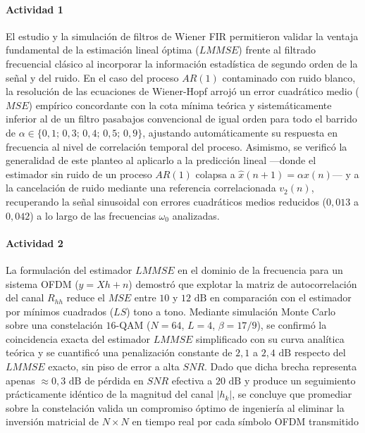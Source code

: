 \documentclass[a4paper]{article}
\begin{document}
\paragraph{Actividad 1}
El estudio y la simulación de filtros de Wiener FIR permitieron validar la ventaja fundamental de la estimación lineal óptima ($LMMSE$) frente al filtrado frecuencial clásico al incorporar la información estadística de segundo orden de la señal y del ruido. En el caso del proceso $AR(1)$ contaminado con ruido blanco, la resolución de las ecuaciones de Wiener-Hopf arrojó un error cuadrático medio ($MSE$) empírico concordante con la cota mínima teórica y sistemáticamente inferior al de un filtro pasabajos convencional de igual orden para todo el barrido de $\alpha \in \{0{,}1;\,0{,}3;\,0{,}4;\,0{,}5;\,0{,}9\}$, ajustando automáticamente su respuesta en frecuencia al nivel de correlación temporal del proceso. Asimismo, se verificó la generalidad de este planteo al aplicarlo a la predicción lineal —donde el estimador sin ruido de un proceso $AR(1)$ colapsa a $\hat{x}(n+1)=\alpha x(n)$— y a la cancelación de ruido mediante una referencia correlacionada $v_2(n)$, recuperando la señal sinusoidal con errores cuadráticos medios reducidos ($0{,}013$ a $0{,}042$) a lo largo de las frecuencias $\omega_0$ analizadas.   

\paragraph{Actividad 2}
La formulación del estimador $LMMSE$ en el dominio de la frecuencia para un sistema OFDM ($y = Xh + n$) demostró que explotar la matriz de autocorrelación del canal $R_{hh}$ reduce el $MSE$ entre $10$ y $12\text{ dB}$ en comparación con el estimador por mínimos cuadrados ($LS$) tono a tono. Mediante simulación Monte Carlo sobre una constelación $16\text{-QAM}$ ($N = 64$, $L = 4$, $\beta = 17/9$), se confirmó la coincidencia exacta del estimador $LMMSE$ simplificado con su curva analítica teórica y se cuantificó una penalización constante de $2{,}1$ a $2{,}4\text{ dB}$ respecto del $LMMSE$ exacto, sin piso de error a alta $SNR$. Dado que dicha brecha representa apenas $\approx 0{,}3\text{ dB}$ de pérdida en $SNR$ efectiva a $20\text{ dB}$ y produce un seguimiento prácticamente idéntico de la magnitud del canal $\vert{}h_k\vert{}$, se concluye que promediar sobre la constelación valida un compromiso óptimo de ingeniería al eliminar la inversión matricial de $N \times N$ en tiempo real por cada símbolo OFDM transmitido
\end{document}
